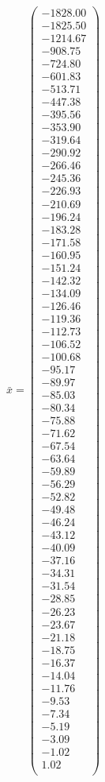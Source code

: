 \documentclass[a4paper,12pt]{article}
\begin{document}
$\bar { x } = \begin{pmatrix}
-1828.00 \\
-1825.50 \\
-1214.67 \\
-908.75 \\
-724.80 \\
-601.83 \\
-513.71 \\
-447.38 \\
-395.56 \\
-353.90 \\
-319.64 \\
-290.92 \\
-266.46 \\
-245.36 \\
-226.93 \\
-210.69 \\
-196.24 \\
-183.28 \\
-171.58 \\
-160.95 \\
-151.24 \\
-142.32 \\
-134.09 \\
-126.46 \\
-119.36 \\
-112.73 \\
-106.52 \\
-100.68 \\
-95.17 \\
-89.97 \\
-85.03 \\
-80.34 \\
-75.88 \\
-71.62 \\
-67.54 \\
-63.64 \\
-59.89 \\
-56.29 \\
-52.82 \\
-49.48 \\
-46.24 \\
-43.12 \\
-40.09 \\
-37.16 \\
-34.31 \\
-31.54 \\
-28.85 \\
-26.23 \\
-23.67 \\
-21.18 \\
-18.75 \\
-16.37 \\
-14.04 \\
-11.76 \\
-9.53 \\
-7.34 \\
-5.19 \\
-3.09 \\
-1.02 \\
1.02 \\
\end{pmatrix}
$
\end{document}
